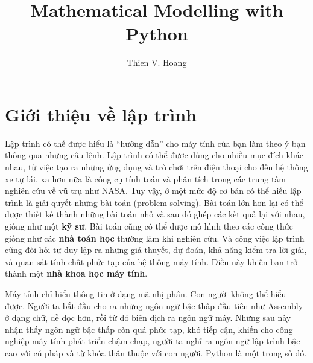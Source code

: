 \documentclass[12pt, a4paper, twoside]{article}
\title{Mathematical Modelling with Python}
\author{Thien V. Hoang}
\begin{document}
\pagestyle{fancy}
\maketitle
{}

\section{Giới thiệu về lập trình}
Lập trình có thể được hiểu là ``hướng dẫn'' cho máy tính của bạn làm theo ý bạn thông qua những câu lệnh. Lập trình có thể được dùng cho nhiều mục đích khác nhau, từ việc tạo ra những ứng dụng và trò chơi trên điện thoại cho đến hệ thống xe tự lái, xa hơn nữa là công cụ tính toán và phân tích trong các trung tâm nghiên cứu về vũ trụ như NASA. Tuy vậy, ở một mức độ cơ bản có thể hiểu lập trình là giải quyết những bài toán (problem solving). Bài toán lớn hơn lại có thể được thiết kế thành những bài toán nhỏ và sau đó ghép các kết quả lại với nhau, giống như một \textbf{kỹ sư}. Bài toán cũng có thể được mô hình theo các công thức giống như các \textbf{nhà toán học} thường làm khi nghiên cứu. Và công việc lập trình cũng đòi hỏi tư duy lập ra những giả thuyết, dự đoán, khả năng kiểm tra lời giải, và quan sát tính chất phức tạp của hệ thống máy tính. Điều này khiến bạn trở thành một \textbf{nhà khoa học máy tính}.

Máy tính chỉ hiểu thông tin ở dạng mã nhị phân. Con người không thể hiểu được. Người ta bắt đầu cho ra những ngôn ngữ bậc thấp đầu tiên như Assembly ở dạng chữ, dễ đọc hơn, rồi từ đó biên dịch ra ngôn ngữ máy. Nhưng sau này nhận thấy ngôn ngữ bậc thấp còn quá phức tạp, khó tiếp cận, khiến cho công nghiệp máy tính phát triển chậm chạp, người ta nghĩ ra ngôn ngữ lập trình bậc cao với cú pháp và từ khóa thân thuộc với con người. Python là một trong số đó.
\end{document}
